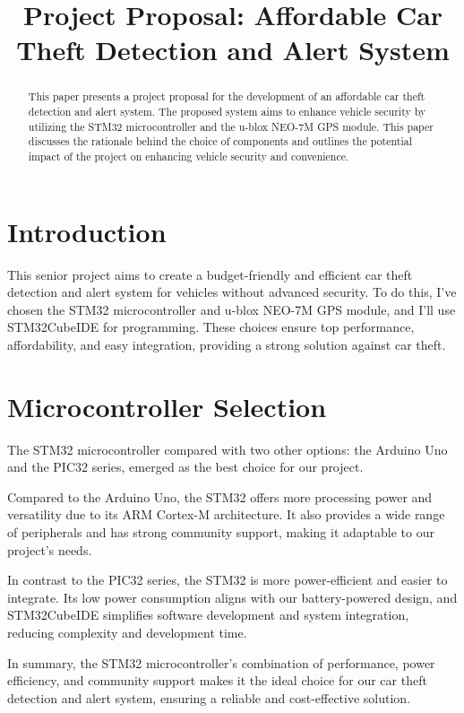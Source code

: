 \documentclass[conference]{IEEEtran}
\begin{document}
\title{Project Proposal: Affordable Car Theft Detection and Alert System}
\author{}
\date{}
\maketitle

\begin{abstract}
This paper presents a project proposal for the development of an affordable car theft detection and alert system. The proposed system aims to enhance vehicle security by utilizing the STM32 microcontroller and the u-blox NEO-7M GPS module. This paper discusses the rationale behind the choice of components and outlines the potential impact of the project on enhancing vehicle security and convenience.
\end{abstract}

\section{Introduction}
This senior project aims to create a budget-friendly and efficient car theft detection and alert system for vehicles without advanced security. To do this, I've chosen the STM32 microcontroller and u-blox NEO-7M GPS module, and I'll use STM32CubeIDE for programming. These choices ensure top performance, affordability, and easy integration, providing a strong solution against car theft.

\section{Microcontroller Selection}
The STM32 microcontroller compared with two other options: the Arduino Uno and the PIC32 series, emerged as the best choice for our project.

Compared to the Arduino Uno, the STM32 offers more processing power and versatility due to its ARM Cortex-M architecture. It also provides a wide range of peripherals and has strong community support, making it adaptable to our project's needs.

In contrast to the PIC32 series, the STM32 is more power-efficient and easier to integrate. Its low power consumption aligns with our battery-powered design, and STM32CubeIDE simplifies software development and system integration, reducing complexity and development time.

In summary, the STM32 microcontroller's combination of performance, power efficiency, and community support makes it the ideal choice for our car theft detection and alert system, ensuring a reliable and cost-effective solution.
\end{document}
